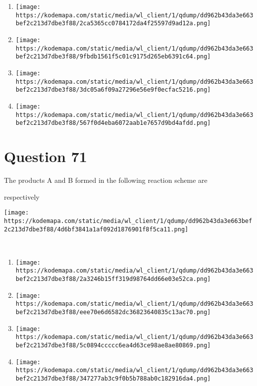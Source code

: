 \documentclass{article}
\begin{document}
\begin{enumerate}[label=(\alph*)]
\item \texttt{[image: https://kodemapa.com/static/media/wl\_client/1/qdump/dd962b43da3e663bef2c213d7dbe3f88/2ca5365cc0784172da4f25597d9ad12a.png]}


\item \texttt{[image: https://kodemapa.com/static/media/wl\_client/1/qdump/dd962b43da3e663bef2c213d7dbe3f88/9fbdb1561f5c01c9175d265eb6391c64.png]}


\item \texttt{[image: https://kodemapa.com/static/media/wl\_client/1/qdump/dd962b43da3e663bef2c213d7dbe3f88/3dc05a6f09a27296e56e9f0ecfac5216.png]}


\item \texttt{[image: https://kodemapa.com/static/media/wl\_client/1/qdump/dd962b43da3e663bef2c213d7dbe3f88/567f0d4eba6072aab1e7657d9bd4afdd.png]}


\end{enumerate}
\newpage
\section*{Question 71}
The products A and B formed in the following reaction scheme are

respectively



\texttt{[image: https://kodemapa.com/static/media/wl\_client/1/qdump/dd962b43da3e663bef2c213d7dbe3f88/4d6bf3841a1af092d1876901f8f5ca11.png]}\\



{}\strut \\


\begin{enumerate}[label=(\alph*)]
\item \texttt{[image: https://kodemapa.com/static/media/wl\_client/1/qdump/dd962b43da3e663bef2c213d7dbe3f88/2a3246b15ff319d98764dd66e03e52ca.png]}


\item \texttt{[image: https://kodemapa.com/static/media/wl\_client/1/qdump/dd962b43da3e663bef2c213d7dbe3f88/eee70e6d6582dc36823640835c13ac70.png]}


\item \texttt{[image: https://kodemapa.com/static/media/wl\_client/1/qdump/dd962b43da3e663bef2c213d7dbe3f88/5c0894ccccc6ea4d63ce98ae8ae80869.png]}


\item \texttt{[image: https://kodemapa.com/static/media/wl\_client/1/qdump/dd962b43da3e663bef2c213d7dbe3f88/347277ab3c9f0b5b788ab0c182916da4.png]}


\end{enumerate}
\newpage
\end{document}
